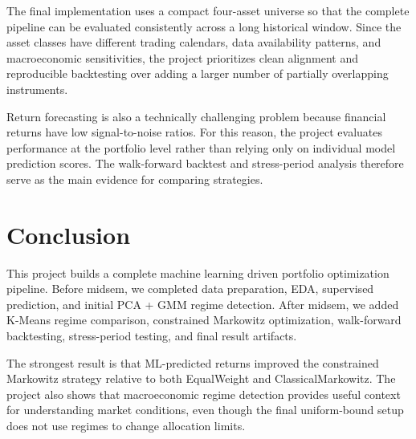 \documentclass[11pt,a4paper]{article}
\begin{document}
The final implementation uses a compact four-asset universe so that the complete pipeline can be evaluated consistently across a long historical window. Since the asset classes have different trading calendars, data availability patterns, and macroeconomic sensitivities, the project prioritizes clean alignment and reproducible backtesting over adding a larger number of partially overlapping instruments.

Return forecasting is also a technically challenging problem because financial returns have low signal-to-noise ratios. For this reason, the project evaluates performance at the portfolio level rather than relying only on individual model prediction scores. The walk-forward backtest and stress-period analysis therefore serve as the main evidence for comparing strategies.

\section{Conclusion}

This project builds a complete machine learning driven portfolio optimization pipeline. Before midsem, we completed data preparation, EDA, supervised prediction, and initial PCA + GMM regime detection. After midsem, we added K-Means regime comparison, constrained Markowitz optimization, walk-forward backtesting, stress-period testing, and final result artifacts.

The strongest result is that ML-predicted returns improved the constrained Markowitz strategy relative to both EqualWeight and ClassicalMarkowitz. The project also shows that macroeconomic regime detection provides useful context for understanding market conditions, even though the final uniform-bound setup does not use regimes to change allocation limits.
\end{document}
